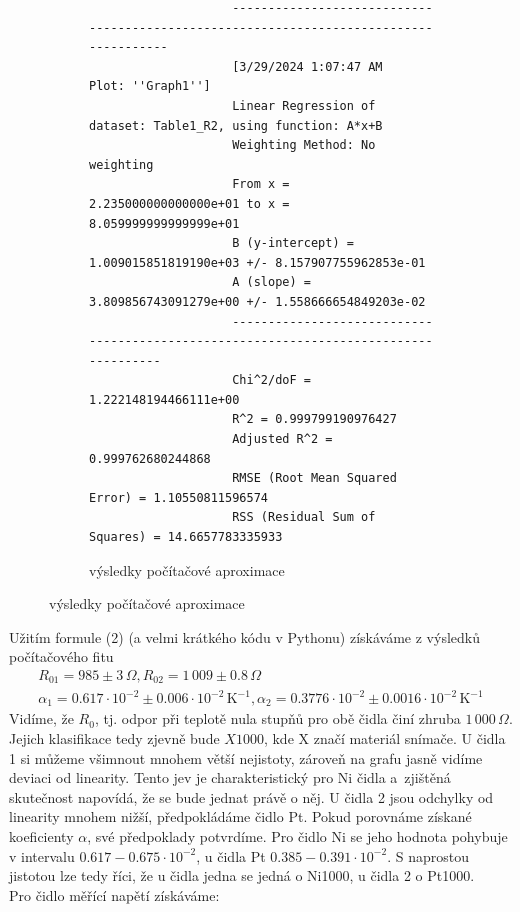 \documentclass[czech,11pt,a4paper]{article}
\begin{document}
\begin{figure}[H]
\begin{subfigure}{0.4\textwidth}
{\begin{verbatim}
					---------------------------------------------------------------------------------------
					[3/29/2024 1:07:47 AM	Plot: ''Graph1'']
					Linear Regression of dataset: Table1_R2, using function: A*x+B
					Weighting Method: No weighting
					From x = 2.235000000000000e+01 to x = 8.059999999999999e+01
					B (y-intercept) = 1.009015851819190e+03 +/- 8.157907755962853e-01
					A (slope) = 3.809856743091279e+00 +/- 1.558666654849203e-02
					--------------------------------------------------------------------------------------
					Chi^2/doF = 1.222148194466111e+00
					R^2 = 0.999799190976427
					Adjusted R^2 = 0.999762680244868
					RMSE (Root Mean Squared Error) = 1.10550811596574
					RSS (Residual Sum of Squares) = 14.6657783335933
			\end{verbatim}}
			\caption{výsledky počítačové aproximace}
		\end{subfigure}
	\end{figure}
	Užitím formule (2) (a velmi krátkého kódu v Pythonu) získáváme z výsledků počítačového fitu
	\begin{gather}
		R_{01} = 985 \pm 3 \, {\Omega} ,  R_{02} = 1\,009 \pm 0.8 \, \Omega \\
		\alpha _1 = 0.617 \cdot 10^{-2} \pm 0.006 \cdot 10^{-2}\, \text{K}^{-1}, \alpha _2 = 0.3776 \cdot 10^{-2} \pm 0.0016 \cdot 10^{-2} \, \text{K}^{-1}
	\end{gather}
	Vidíme, že $R_0$, tj. odpor při teplotě nula stupňů pro obě čidla činí zhruba $1\, 000 \, \Omega$. Jejich klasifikace tedy zjevně bude $X1000$, kde X značí materiál snímače. U čidla 1 si můžeme všimnout mnohem větší nejistoty, zároveň na grafu jasně vidíme deviaci od linearity. Tento jev je charakteristický pro Ni čidla a~zjištěná skutečnost napovídá, že se bude jednat právě o něj. U čidla 2 jsou odchylky od linearity mnohem nižší, předpokládáme čidlo Pt.
	Pokud porovnáme získané koeficienty $\alpha$, své předpoklady potvrdíme. Pro čidlo Ni se jeho hodnota pohybuje v intervalu $ 0.617 - 0.675 \cdot 10^{-2}$, u čidla Pt $ 0.385 - 0.391 \cdot 10^{-2}$. S naprostou jistotou lze tedy říci, že u čidla jedna se jedná o Ni1000, u čidla 2 o Pt1000.
	\\
	Pro čidlo měřící napětí získáváme:
\end{document}
